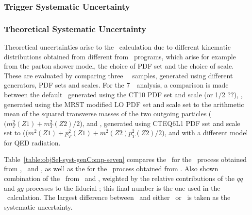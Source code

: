 \subsubsection{Trigger Systematic Uncertainty}

\subsubsection{Theoretical Systematic Uncertainty}

Theoretical uncertainties arise to the \CZZ\ calculation due to different
kinematic distributions obtained from different from \mc\ programs, which arise
for example from the parton shower model, the choice of PDF set and the choice
of scale. These are evaluated by comparing three \qqZZ\ \mc\ samples, generated
using different generators, PDF sets and scales. For the 7~\tev\ analysis, a
comparison is made between the default \powhegbox\ generated using the CT10 PDF
set and scale \mZZ (or 1/2 \mZZ??), \pythia, generated using the MRST modified LO PDF set and scale
set to the arithmetic mean of the squared transverse masses of the two outgoing
particles ($(m^{2}_{T}(Z1)+m^{2}_{T}(Z2)/2$), and
\sherpa, generated using CTEQ6L1 PDF set and scale set to
($(m^{2}_{}(Z1)+p^{2}_{T}(Z1)+m^{2}_{}(Z2)p^{2}_{T}(Z2)/2$), and with a different
model for QED radiation.

Table~\ref{table:objSel-syst-genComp-seven} compares the \CZZ\ for the \qqZZ\
process obtained from \powhegbox, \sherpa\ and \pythia, as well as the for the
\CZZ\ process obtained from \ggtwoZZ. Also shown combination of
the \CZZ\ from \powhegbox\ and \ggtwoZZ, weighted by the relative contributions
of the $qq$ and $gg$ processes to the fiducial \cx; this final number is the one
used in the \cx\ calculation. The largest difference between \powhegbox\ and
either \pythia\ or \sherpa\ is taken as the systematic uncertainty.

